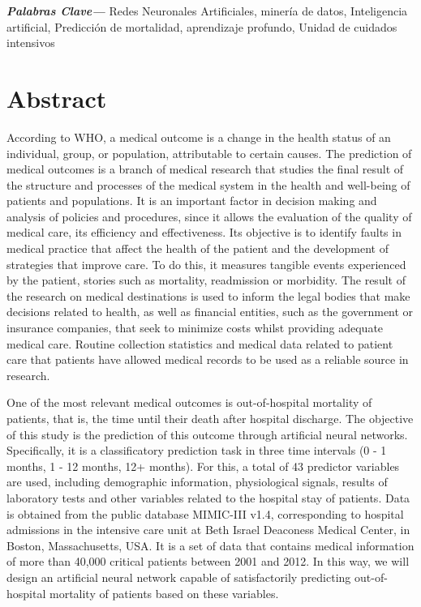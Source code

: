 \documentclass{report}
\providecommand{\keywords}[2]
{
  \small    
  \textbf{\textit{#2---}} #1 
}
\begin{document}
\keywords{Redes Neuronales Artificiales, minería de datos, Inteligencia artificial, Predicción de mortalidad, aprendizaje profundo, Unidad de cuidados intensivos}{Palabras Clave}

\chapter*{Abstract}
\vspace{-5mm}
According to WHO, a medical outcome is a change in the health status of an individual, group, or population, attributable to certain causes. The prediction of medical outcomes is a branch of medical research that studies the final result of the structure and processes of the medical system in the health and well-being of patients and populations. It is an important factor in decision making and analysis of policies and procedures, since it allows the evaluation of the quality of medical care, its efficiency and effectiveness. Its objective is to identify faults in medical practice that affect the health of the patient and the development of strategies that improve care. To do this, it measures tangible events experienced by the patient, stories such as mortality, readmission or morbidity. The result of the research on medical destinations is used to inform the legal bodies that make decisions related to health, as well as financial entities, such as the government or insurance companies, that seek to minimize costs whilst providing adequate medical care. Routine collection statistics and medical data related to patient care that patients have allowed medical records to be used as a reliable source in research.

One of the most relevant medical outcomes is out-of-hospital mortality of patients, that is, the time until their death after hospital discharge. The objective of this study is the prediction of this outcome through artificial neural networks. Specifically, it is a classificatory prediction task in three time intervals (0 - 1 months, 1 - 12 months, 12+ months). For this, a total of 43 predictor variables are used, including demographic information, physiological signals, results of laboratory tests and other variables related to the hospital stay of patients. Data is obtained from the public database MIMIC-III v1.4, corresponding to hospital admissions in the intensive care unit at Beth Israel Deaconess Medical Center, in Boston, Massachusetts, USA. It is a set of data that contains medical information of more than 40,000 critical patients between 2001 and 2012. In this way, we will design an artificial neural network capable of satisfactorily predicting out-of-hospital mortality of patients based on these variables.
\end{document}
